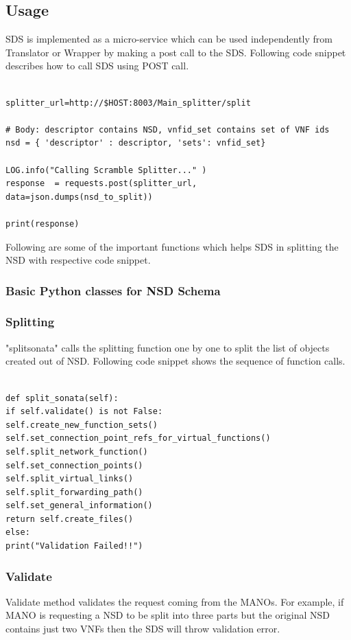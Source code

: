 \subsection{Usage}

SDS is implemented as a micro-service which can be used independently from Translator or Wrapper by making a post call to the SDS. Following code snippet describes how to call SDS using POST call.

\begin{lstlisting}[caption=POST call to SDS, label=lis:postSDS]

splitter_url=http://$HOST:8003/Main_splitter/split

# Body: descriptor contains NSD, vnfid_set contains set of VNF ids
nsd = { 'descriptor' : descriptor, 'sets': vnfid_set}

LOG.info("Calling Scramble Splitter..." )
response  = requests.post(splitter_url,
data=json.dumps(nsd_to_split))

print(response)

\end{lstlisting}

Following are some of the important functions which helps SDS in splitting the NSD with respective code snippet.

\subsubsection{Basic Python classes for NSD Schema}
\subsubsection{Splitting} "splitsonata" calls the splitting function one by one to split the list of objects created out of NSD. Following code snippet shows the sequence of function calls.

\begin{lstlisting}[caption=Sequence of function calls, label=lis:functioncalls]

def split_sonata(self):
if self.validate() is not False:
self.create_new_function_sets()
self.set_connection_point_refs_for_virtual_functions()
self.split_network_function()
self.set_connection_points()
self.split_virtual_links()
self.split_forwarding_path()
self.set_general_information()
return self.create_files()
else:
print("Validation Failed!!")

\end{lstlisting}

\subsubsection{Validate} Validate method validates the request coming from the MANOs. For example, if MANO is requesting a NSD to be split into three parts but the original NSD contains just two VNFs then the SDS will throw validation error.

